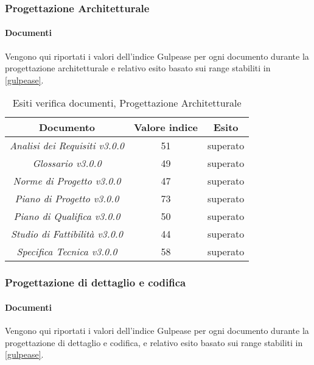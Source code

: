 	
	\subsubsection{Progettazione Architetturale}
	\paragraph{Documenti}
	 Vengono qui riportati i valori dell’indice Gulpease per ogni documento durante la progettazione architetturale e relativo esito basato sui range stabiliti in \ref{gulpease}.
	
	\begin{table}[H]
	\centering
	\begin{tabular}{ | c | c | c | }
    \hline
    Documento & Valore indice & Esito \\ \hline
    \emph{Analisi dei Requisiti v3.0.0} & 51 &  superato \\ \hline
    \emph{Glossario v3.0.0} & 49 &  superato \\ \hline
    \emph{Norme di Progetto v3.0.0} & 47 &  superato \\ \hline
    \emph{Piano di Progetto v3.0.0} & 73 &  superato \\ \hline
    \emph{Piano di Qualifica v3.0.0} & 50 &  superato \\ \hline
    \emph{Studio di Fattibilità v3.0.0} & 44 &  superato \\ \hline
    \emph{Specifica Tecnica v3.0.0} & 58 & superato \\ \hline
    \end{tabular}
	\caption{Esiti verifica documenti, Progettazione Architetturale}
	\end{table}
	

	\subsubsection{Progettazione di dettaglio e codifica}
	\paragraph{Documenti}
	 Vengono qui riportati i valori dell’indice Gulpease per ogni documento durante la progettazione di dettaglio e codifica, e relativo esito basato sui range stabiliti in \ref{gulpease}.
	

